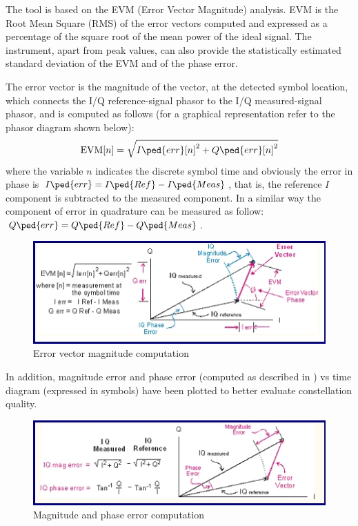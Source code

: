 The tool is based on the EVM (Error Vector Magnitude) analysis. EVM is the Root Mean Square (RMS) of the error vectors computed and expressed as a percentage of the square root of the mean power of the ideal signal. The instrument, apart from peak values, can also provide the statistically estimated standard deviation of the EVM and of the phase error.

The error vector is the magnitude of the vector, at the detected symbol location, which connects the I/Q reference-signal phasor to the I/Q measured-signal phasor, and is computed as follows (for a graphical representation refer to the phasor diagram shown below):
\begin{equation}
\mathrm{EVM}[n] = \sqrt{{I\ped{err}[n]}^2 + {Q\ped{err}[n]}^2}
\end{equation}
where the variable \(n\) indicates the discrete symbol time and obviously the error in phase is \(I\ped{err} = I\ped{Ref}-I\ped{Meas}\), that is, the reference \(I\) component is subtracted to the measured component.
In a similar way the component of error in quadrature can be measured as follow: \(Q\ped{err} = Q\ped{Ref}-Q\ped{Meas}\).

\begin{figure} \centering
\includegraphics[scale=.8]{EVMAGN}
\caption{Error vector magnitude computation} \label{fig:EVMAGN}
\end{figure}

In addition, magnitude error and phase error (computed as described in ) vs time diagram (expressed in symbols) have been plotted to better evaluate constellation quality.

\begin{figure} \centering
\includegraphics[scale=.8]{MAGNPHASE}
\caption{Magnitude and phase error computation} \label{fig:MAGNPHASE}
\end{figure}

